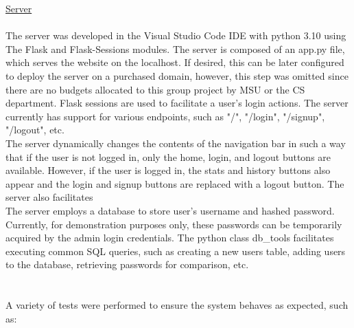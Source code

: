 \documentclass[12pt]{article}
\begin{document}
\noindent \underline{Server}\\
\\The server was developed in the Visual Studio Code IDE with python 3.10 using The Flask and Flask-Sessions modules. The server is composed of an app.py file, which serves the website on the localhost. If desired, this can be later configured to deploy the server on a purchased domain, however, this step was omitted since there are no budgets allocated to this group project by MSU or the CS department. Flask sessions are used to facilitate a user's login actions. The server currently has support for various endpoints, such as "/", "/login", "/signup", "/logout", etc.
\\The server dynamically changes the contents of the navigation bar in such a way that if the user is not logged in, only the home, login, and logout buttons are available. However, if the user is logged in, the stats and history buttons also appear and the login and signup buttons are replaced with a logout button. The server also facilitates
\\The server employs a database to store user's username and hashed password. Currently, for demonstration purposes only, these passwords can be temporarily acquired by the admin login credentials. The python class db\_tools facilitates executing common SQL queries, such as creating a new users table, adding users to the database, retrieving passwords for comparison, etc.\\\\\\
A variety of tests were performed to ensure the system behaves as expected, such as:
\end{document}

